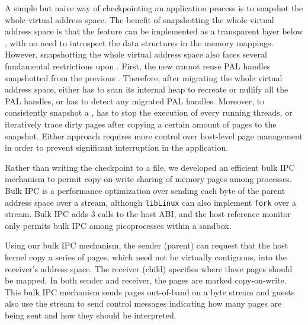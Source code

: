 A simple but naive way of checkpointing an application process
is to snapshot the whole virtual address space.
The benefit of snapshotting the whole virtual address space
is that the feature
can be implemented as a transparent layer below \thelibos{},
with no need to introspect the data structures in the \thelibos{} memory mappings.
However, snapshotting the whole virtual address space
also faces several fundamental restrictions upon \thehostabi{}.
First, the new \picoproc{} cannot reuse PAL handles snapshotted from the previous \picoproc{}.
Therefore, after migrating the whole virtual address space,
either \thelibos{} has to scan its internal heap to recreate or nullify all the PAL handles, or \thehostabi{} has to detect any migrated PAL handles.
Moreover, to consistently snapshot a \picoproc{},
\thelibos{} has to stop the execution of every running threads,
or iteratively trace dirty pages after copying a certain amount of pages to the snapshot.
Either approach requires more control over host-level page management
in order to prevent significant interruption in the application.





Rather than writing the checkpoint to a file, 
we developed an efficient bulk IPC mechanism to 
permit copy-on-write sharing of memory pages among processes.
Bulk IPC is a performance optimization over sending each byte of the parent address
space over a stream, although {\tt libLinux} can also implement {\tt fork}
over a stream.
Bulk IPC adds 3 calls to the host ABI,
and the host reference monitor only permits bulk IPC among
picoprocesses within a sandbox.



Using our bulk IPC mechanism,
the sender (parent) can request that the host kernel copy
a series of pages, which need not be virtually contiguous,
into the receiver's address space.
The receiver (child) specifies where these pages should be mapped.
In both sender and receiver, the pages are marked copy-on-write.  
This bulk IPC mechanism sends pages out-of-band on a byte stream and guests also use the stream to send control messages 
indicating 
how many pages are being sent and how they should be interpreted.

